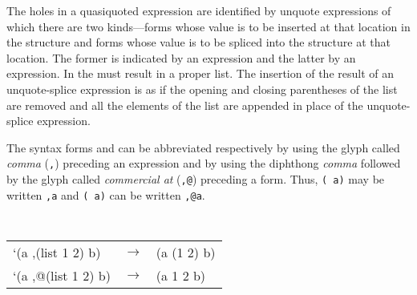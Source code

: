 \begin{optDefinition}
\Syntax
{}%
%
\remarks%
The holes in a quasiquoted expression are identified by unquote expressions of
which there are two kinds---forms whose value is to be inserted at that location
in the structure and forms whose value is to be spliced into the structure at
that location.  The former is indicated by an  expression and
the latter by an  expression.  In
 the  must result in a proper list.  The
insertion of the result of an unquote-splice expression is as if the opening and
closing parentheses of the list are removed and all the elements of the list are
appended in place of the unquote-splice expression.

The syntax forms  and  can be
abbreviated respectively by using the glyph called {\em comma}
(\verb+,+) preceding an
expression and by using the diphthong {\em comma} followed by the glyph called
{\em commercial at} (\verb+,@+)
preceding a form.  Thus, {\tt ( a)} may be written {\tt ,a}
and {\tt ( a)} can be written {\tt ,@a}.
%
\examples
{\tt
\begin{tabular}{lll}
    `(a ,(list 1 2) b) & $\rightarrow$ & (a (1 2) b)\\
    `(a ,@(list 1 2) b) & $\rightarrow$ & (a 1 2 b)
\end{tabular}}
%
\end{optDefinition}

